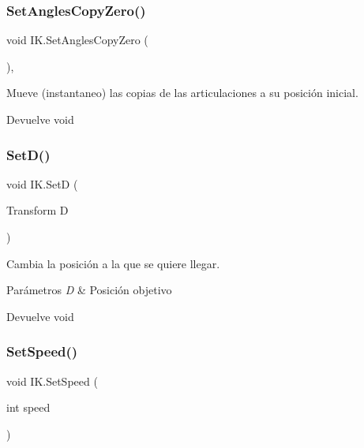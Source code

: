 \subsubsection{\texorpdfstring{SetAnglesCopyZero()}{SetAnglesCopyZero()}}
{\footnotesize\ttfamily void I\+K.\+Set\+Angles\+Copy\+Zero (\begin{DoxyParamCaption}{ }\end{DoxyParamCaption})\hspace{0.3cm}{\ttfamily [inline]}, {\ttfamily [private]}}

Mueve (instantaneo) las copias de las articulaciones a su posición inicial. \begin{DoxyReturn}{Devuelve}
void 
\end{DoxyReturn}
\mbox{\label{class_i_k_aa97be23f240e84f80c9d1709877e46f4}} 
\subsubsection{\texorpdfstring{SetD()}{SetD()}}
{\footnotesize\ttfamily void I\+K.\+SetD (\begin{DoxyParamCaption}\item[{Transform}]{D }\end{DoxyParamCaption})\hspace{0.3cm}{\ttfamily [inline]}}

Cambia la posición a la que se quiere llegar. 
\begin{DoxyParams}{Parámetros}
{\em D} & Posición objetivo \\
\hline
\end{DoxyParams}
\begin{DoxyReturn}{Devuelve}
void 
\end{DoxyReturn}
\mbox{\label{class_i_k_af3fe9338cf146836289725c4d7f001ff}} 
\subsubsection{\texorpdfstring{SetSpeed()}{SetSpeed()}}
{\footnotesize\ttfamily void I\+K.\+Set\+Speed (\begin{DoxyParamCaption}\item[{int}]{speed }\end{DoxyParamCaption})\hspace{0.3cm}{\ttfamily [inline]}}

